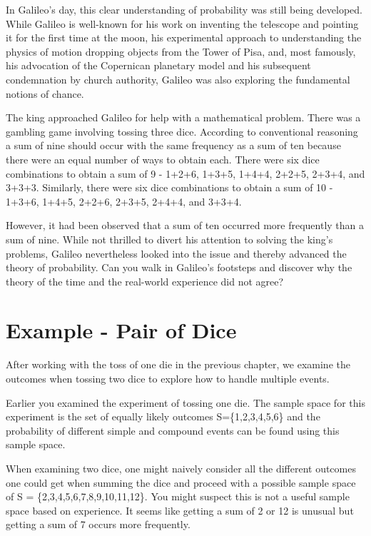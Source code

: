 \documentclass[]{book}
\theoremstyle{definition}
\theoremstyle{definition}
\theoremstyle{definition}
\theoremstyle{remark}
\begin{document}
In Galileo's day, this clear understanding of probability was still
being developed. While Galileo is well-known for his work on inventing
the telescope and pointing it for the first time at the moon, his
experimental approach to understanding the physics of motion dropping
objects from the Tower of Pisa, and, most famously, his advocation of
the Copernican planetary model and his subsequent condemnation by church
authority, Galileo was also exploring the fundamental notions of chance.

The king approached Galileo for help with a mathematical problem. There
was a gambling game involving tossing three dice. According to
conventional reasoning a sum of nine should occur with the same
frequency as a sum of ten because there were an equal number of ways to
obtain each. There were six dice combinations to obtain a sum of 9 -
1+2+6, 1+3+5, 1+4+4, 2+2+5, 2+3+4, and 3+3+3. Similarly, there were six
dice combinations to obtain a sum of 10 - 1+3+6, 1+4+5, 2+2+6, 2+3+5,
2+4+4, and 3+3+4.

However, it had been observed that a sum of ten occurred more frequently
than a sum of nine. While not thrilled to divert his attention to
solving the king's problems, Galileo nevertheless looked into the issue
and thereby advanced the theory of probability. Can you walk in
Galileo's footsteps and discover why the theory of the time and the
real-world experience did not agree?

\section{Example - Pair of Dice}\label{example---pair-of-dice}

After working with the toss of one die in the previous chapter, we
examine the outcomes when tossing two dice to explore how to handle
multiple events.

Earlier you examined the experiment of tossing one die. The sample space
for this experiment is the set of equally likely outcomes
S=\{1,2,3,4,5,6\} and the probability of different simple and compound
events can be found using this sample space.

When examining two dice, one might naively consider all the different
outcomes one could get when summing the dice and proceed with a possible
sample space of S = \{2,3,4,5,6,7,8,9,10,11,12\}. You might suspect this
is not a useful sample space based on experience. It seems like getting
a sum of 2 or 12 is unusual but getting a sum of 7 occurs more
frequently.
\end{document}
